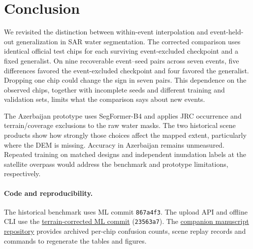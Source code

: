 \section{Conclusion}
\label{sec:conclusion}

We revisited the distinction between within-event interpolation and
event-held-out generalization in SAR water segmentation. The corrected
comparison uses identical official test chips for each surviving
event-excluded checkpoint and a fixed generalist. On nine recoverable
event--seed pairs across seven events, five differences favored the
event-excluded checkpoint and four favored the generalist. Dropping
one chip could change the sign in seven pairs. This dependence on the
observed chips, together with incomplete seeds and different training
and validation sets, limits what the comparison says about new events.

The Azerbaijan prototype uses SegFormer-B4 and applies JRC occurrence
and terrain/coverage exclusions to the raw water masks. The two
historical scene products show how strongly those choices affect the
mapped extent, particularly where the DEM is missing. Accuracy in
Azerbaijan remains unmeasured. Repeated training on matched designs
and independent inundation labels at the satellite overpass would
address the benchmark and prototype limitations, respectively.

\paragraph{Code and reproducibility.}
The historical benchmark uses ML commit \texttt{867a4f3}. The upload
API and offline CLI use the
\href{https://github.com/AliAgabalayev/Flood-Damage-Detection/commit/23563a7bebf28e508b394cf6858649718fd148a3}{terrain-corrected ML commit}
(\texttt{23563a7}). The
\href{https://github.com/AliAgabalayev/flood-paper/tree/paper-v1.0}{companion manuscript repository}
provides archived per-chip confusion counts, scene replay records and
commands to regenerate the tables and figures.
